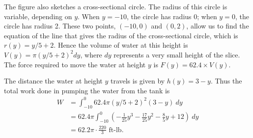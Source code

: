\begin{example}
The figure also sketches %
a cross-sectional circle. The radius of this circle is variable, depending on $y$. When $y=-10$, the circle has radius 0; when $y=0$, the circle has radius 2. These two points, $(-10,0)$ and $(0,2)$, allow us to find the equation of the line that gives the radius of the cross-sectional circle, which is $r(y) = y/5+2$. Hence the volume of water at this height is $V(y)=\pi(y/5+2)^2dy$, where $dy$ represents a very small height of the slice. The force required to move the water at height $y$ is $F(y) = 62.4\times V(y)$.

The distance the water at height $y$ travels is given by $h(y)=3-y$. Thus the total work done in pumping the water from the tank is 
\begin{align*}
	W
	&= \int_{-10}^0 62.4\pi(y/5+2)^2(3-y)\ dy\\
	&= 62.4\pi\int_{-10}^0\left(-\frac1{25}y^3-\frac{17}{25}y^2-\frac85y+12\right)\ dy\\
	&= 62.2\pi\cdot\frac{220}{3} %
	\text{ ft-lb.}
\end{align*}
\end{example}

